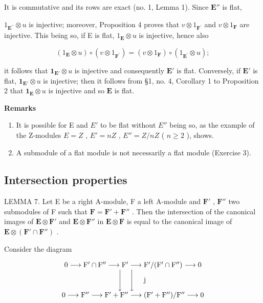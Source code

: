 It is commutative and its rows are exact (no. 1, Lemma 1). Since \(\mathbf{E}''\) is flat,

\(1_{\mathbf{E}^{\prime \prime}} \otimes u\) is injective; moreover, Proposition 4 proves that \(v \otimes 1_{\mathbf{F}^{\prime}}\) and \(v \otimes 1_{\mathbf{F}}\) are injective. This being so, if E is flat, \(1_{\mathbf{E}} \otimes u\) is injective, hence also

\[
\left(1 _ {\mathbf {E}} \otimes u\right) \circ (v \otimes 1 _ {\mathbf {F} ^ {\prime}}) = (v \otimes 1 _ {\mathbf {F}}) \circ \left(1 _ {\mathbf {E} ^ {\prime}} \otimes u\right);
\]

it follows that \(\mathbf{1}_{\mathbf{E}'} \otimes u\) is injective and consequently \(\mathbf{E}'\) is flat. Conversely, if \(\mathbf{E}'\) is flat, \(\mathbf{1}_{\mathbf{E}'} \otimes u\) is injective; then it follows from §1, no. 4, Corollary 1 to Proposition 2 that \(\mathbf{1}_{\mathbf{E}} \otimes u\) is injective and so \(\mathbf{E}\) is flat.

\textbf{Remarks}\par

\begin{enumerate}
\def\labelenumi{(\arabic{enumi})}
\item
  It is possible for E and \(E'\) to be flat without \(E''\) being so, as the example of the Z-modules \(E = Z\) , \(E' = nZ\) , \(E'' = Z/nZ\) ( \(n \geqslant 2\) ), shows.
\item
  A submodule of a flat module is not necessarily a flat module (Exercise 3).
\end{enumerate}

\subsection{Intersection properties}

LEMMA 7. Let E be a right A-module, F a left A-module and \(\mathbf{F}'\) , \(\mathbf{F}''\) two submodules of F such that \(\mathbf{F} = \mathbf{F}' + \mathbf{F}''\) . Then the intersection of the canonical images of \(\mathbf{E} \otimes \mathbf{F}'\) and \(\mathbf{E} \otimes \mathbf{F}''\) in \(\mathbf{E} \otimes \mathbf{F}\) is equal to the canonical image of \(\mathbf{E} \otimes (\mathbf{F}' \cap \mathbf{F}'')\) .

Consider the diagram

\[
\begin{array}{c} 0 \longrightarrow \mathrm{F} ^ {\prime} \cap \mathrm{F} ^ {\prime \prime} \longrightarrow \mathrm{F} ^ {\prime} \longrightarrow \mathrm{F} ^ {\prime} / (\mathrm{F} ^ {\prime} \cap \mathrm{F} ^ {\prime \prime}) \longrightarrow 0 \\ \Biggl \downarrow \quad \Biggl \downarrow \quad \text {   j   } \\ 0 \longrightarrow \mathrm{F} ^ {\prime \prime} \longrightarrow \mathrm{F} ^ {\prime} + \mathrm{F} ^ {\prime \prime} \longrightarrow (\mathrm{F} ^ {\prime} + \mathrm{F} ^ {\prime \prime}) / \mathrm{F} ^ {\prime \prime} \longrightarrow 0 \end{array}
\]

